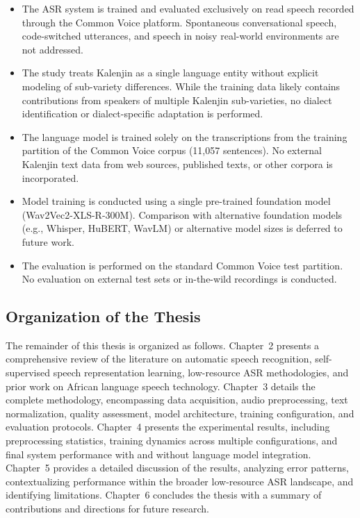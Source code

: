 \documentclass[12pt,a4paper]{article}
\begin{document}
\begin{itemize}[leftmargin=2em]
    \item The ASR system is trained and evaluated exclusively on read speech recorded through the Common Voice platform. Spontaneous conversational speech, code-switched utterances, and speech in noisy real-world environments are not addressed.

    \item The study treats Kalenjin as a single language entity without explicit modeling of sub-variety differences. While the training data likely contains contributions from speakers of multiple Kalenjin sub-varieties, no dialect identification or dialect-specific adaptation is performed.

    \item The language model is trained solely on the transcriptions from the training partition of the Common Voice corpus (11,057 sentences). No external Kalenjin text data from web sources, published texts, or other corpora is incorporated.

    \item Model training is conducted using a single pre-trained foundation model (Wav2Vec2-XLS-R-300M). Comparison with alternative foundation models (e.g., Whisper, HuBERT, WavLM) or alternative model sizes is deferred to future work.

    \item The evaluation is performed on the standard Common Voice test partition. No evaluation on external test sets or in-the-wild recordings is conducted.
\end{itemize}

\subsection{Organization of the Thesis}

The remainder of this thesis is organized as follows. Chapter~2 presents a comprehensive review of the literature on automatic speech recognition, self-supervised speech representation learning, low-resource ASR methodologies, and prior work on African language speech technology. Chapter~3 details the complete methodology, encompassing data acquisition, audio preprocessing, text normalization, quality assessment, model architecture, training configuration, and evaluation protocols. Chapter~4 presents the experimental results, including preprocessing statistics, training dynamics across multiple configurations, and final system performance with and without language model integration. Chapter~5 provides a detailed discussion of the results, analyzing error patterns, contextualizing performance within the broader low-resource ASR landscape, and identifying limitations. Chapter~6 concludes the thesis with a summary of contributions and directions for future research.
\end{document}
